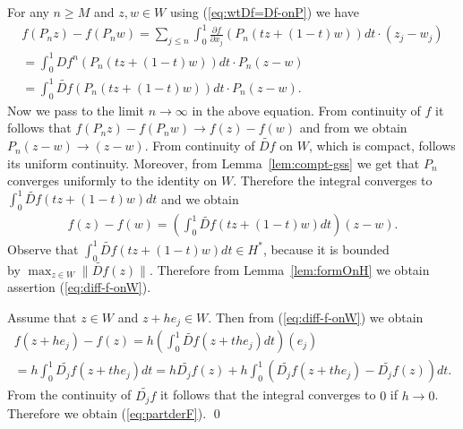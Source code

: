 For any $n \geq M$ and  $z,w \in W$ using (\ref{eq:wtDf=Df-onP}) we have
\begin{eqnarray*}
	f(P_n z) - f(P_n w)=\sum_{j \leq n} \int_0^1 \frac{\partial f}{\partial x_j}(P_n (t z + (1-t)w))dt \cdot (z_j - w_j) \\
	= \int_{0}^1 Df^n(P_n (t z + (1-t)w))dt \cdot P_n(z-w)  \\
	= \int_{0}^1 \widetilde{Df}(P_n (t z + (1-t)w))dt \cdot P_n(z-w).
\end{eqnarray*}
Now we pass to the limit $n \to \infty$ in the above equation. From continuity of $f$ it follows that  $f(P_n z) - f(P_n w) \to f(z) - f(w)$ and from  we obtain $ P_n(z-w)  \to (z-w)$. From continuity of $\widetilde{Df}$ on $W$, which is compact,  follows its uniform continuity. Moreover, from Lemma~\ref{lem:compt-gss} we get that $P_n$ converges uniformly to the identity on $W$. Therefore the integral converges to  $\int_{0}^1 \widetilde{Df}(t z + (1-t)w)dt$ and we obtain
\begin{eqnarray*}
	f(z) - f(w)= \left(\int_{0}^1 \widetilde{Df}(t z + (1-t)w)dt\right) (z-w).
\end{eqnarray*}
Observe that $\int_{0}^1 \widetilde{Df}(t z + (1-t)w)dt \in H^*$, because it is bounded \\
by $\max_{z \in W} \|\widetilde{Df}(z)\|$.  Therefore from Lemma~\ref{lem:formOnH} we obtain assertion (\ref{eq:diff-f-onW}).

Assume that $z \in W$ and $z+he_j \in W$. Then from (\ref{eq:diff-f-onW}) we obtain
\begin{eqnarray*}
	f(z+he_j) -f(z)= h \left(\int_{0}^1 \widetilde{Df}(z + th e_j)dt\right)(e_j) \\
	= h \int_{0}^1 \widetilde{D_jf}(z + th e_j)dt = h \widetilde{D_jf}(z) + h\int_0^1\left( \widetilde{D_jf}(z + th e_j) - \widetilde{D_jf}(z) \right)dt.
\end{eqnarray*}
From the continuity of $ \widetilde{D_jf}$ it follows that the integral converges to $0$ if $h \to 0$. Therefore we obtain (\ref{eq:partderF}).
\qed

